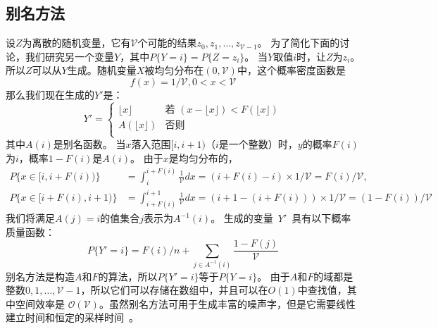 \subsection{别名方法}

设$ Z $为离散的随机变量，它有$\mathcal{V}$个可能的结果$ z_0,z_1,\ldots,z_ {\mathcal{V}-1} $。 为了简化下面的讨论，我们研究另一个变量$ Y $，其中$ P \{Y = i \} = P \{Z = z_i \} $。 当$ Y $取值$ i $时，让$ Z $为$ z_i $。 所以$ Z $可以从$ Y $生成。随机变量$ X $被均匀分布在$(0,\mathcal{V})$中，这个概率密度函数是
\begin{equation}\label{equ:alias}
 f(x) = 1/\mathcal{V}, 0 < x < \mathcal{V}
\end{equation}
那么我们现在生成的$Y'$是：
\begin{equation}\label{equ:gen}
  Y' =  \left\{
 \begin{array}{rl}
  \lfloor x  \rfloor & \text{若 } (x - \lfloor x \rfloor) < F(\lfloor x \rfloor)\\
  A(\lfloor x \rfloor)  & \text{否则}\\
 \end{array} \right.
\end{equation}
其中$ A(i)$是别名函数。 当$ x $落入范围$ [i,i + 1)$（$ i $是一个整数）时，$ y $的概率$ F(i)$为$ i $，概率$ 1 - F(i )$是$ A(i)$。 由于$ x $是均匀分布的，
\begin{equation}
  \begin{split}
P\{x \in [i, i + F(i))\}     &= \int_i^{i+F(i)}\frac{1}{\mathcal{V}}dx= (i + F(i) - i) \times 1/\mathcal{V}= F(i)/\mathcal{V},\\
P\{x \in [i + F(i), i + 1)\} &= \int_{i+F(i)}^{i+1}\frac{1}{\mathcal{V}}dx= (i + 1 - (i + F(i))) \times 1/\mathcal{V}= (1-F(i))/\mathcal{V}
\end{split}
\end{equation}
我们将满足$ A(j)= i $的值集合$ j $表示为$A^{- 1}(i)$。 生成的变量~$Y'$~具有以下概率质量函数：
\begin{equation}
  P\{Y' = i\} = F(i)/n + \sum_{j \in A^{-1}(i)}\frac{1-F(j)}{\mathcal{V}}
\end{equation}
别名方法是构造$ A $和$ F $的算法，所以$ P \{Y'= i \} $等于$ P\{Y = i \} $。 由于$ A $和$ F $的域都是整数$ 0,1,\ldots, \mathcal{V}-1 $，所以它们可以存储在数组中，并且可以在$O(1)$中查找值，其中空间效率是 $\mathcal{O}(\mathcal{V})$。虽然别名方法可用于生成丰富的噪声字，但是它需要线性建立时间和恒定的采样时间~。

